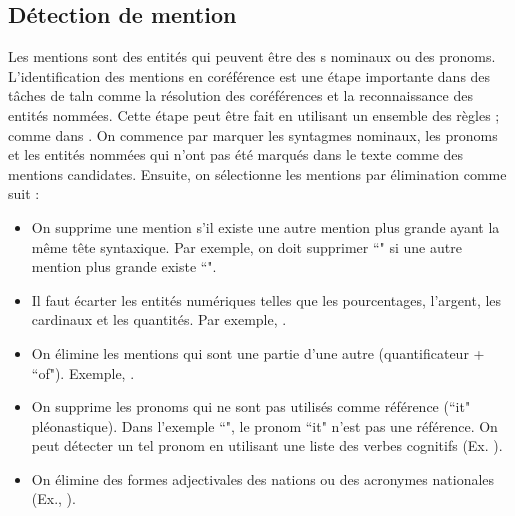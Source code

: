 \documentclass{KodeBook}
\begin{document}
\subsection{Détection de mention}

Les mentions sont des entités qui peuvent être des s nominaux ou des pronoms.
L'identification des mentions en coréférence est une étape importante dans des tâches de \ac{taln} comme la résolution des coréférences et la reconnaissance des entités nommées.
Cette étape peut être fait en utilisant un ensemble des règles ; comme dans \cite{2013-lee-al}.
On commence par marquer les syntagmes nominaux, les pronoms et les entités nommées qui n'ont pas été marqués dans le texte comme des mentions candidates. 
Ensuite, on sélectionne les mentions par élimination comme suit :
\begin{itemize}
	\item On supprime une mention s'il existe une autre mention plus grande ayant la même tête syntaxique. 
	Par exemple, on doit supprimer ``" si une autre mention plus grande existe ``". 
	
	\item Il faut écarter les entités numériques telles que les pourcentages, l'argent, les cardinaux et les quantités. 
	Par exemple, .
	
	\item On élimine les mentions qui sont une partie d'une autre (quantificateur + ``of"). 
	Exemple, .
	
	\item On supprime les pronoms qui ne sont pas utilisés comme référence (``it" pléonastique). 
	Dans l'exemple ``", le pronom ``it" n'est pas une référence. 
	On peut détecter un tel pronom en utilisant une liste des verbes cognitifs (Ex. ).
	
	\item On élimine des formes adjectivales des nations ou des acronymes nationales (Ex.,
	).
\end{itemize}
\end{document}
